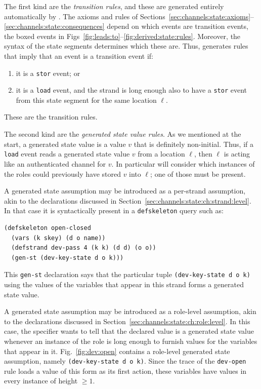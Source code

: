 The first kind are the \emph{transition rules}, and these are
generated entirely automatically by {\cpsa}.  The axioms and rules of
Sections~\ref{sec:channels:state:axioms}--\ref{sec:channels:state:consequences}
depend on which events are transition events, the boxed events in
Figs~\ref{fig:leads:to}--\ref{fig:derived:state:rules}.  Moreover, the
syntax of the state segments determines which these are.  Thus,
{\cpsa} generates rules that imply that an event is a transition event
if:
%
\begin{enumerate}
  \item it is a \verb|stor| event; or
  \item it is a \verb|load| event, and the strand is long enough also
  to have a \verb|stor| event from this state segment for the same
  location $\ell$.
\end{enumerate}
%
These are the transition rules.

The second kind are the \emph{generated state value rules}.  As we
mentioned at the start, a generated state value is a value $v$ that is
definitely non-initial.  Thus, if a \verb|load| event reads a
generated state value $v$ from a location $\ell$, then $\ell$ is
acting like an authenticated channel for $v$.  In particular {\cpsa}
will consider which instances of the roles could previously have
stored $v$ into $\ell$; one of those must be present.

A generated state assumption may be introduced as a per-strand
assumption, akin to the declarations discussed in
Section~\ref{sec:channels:state:ch:strand:level}.  In that case it is
syntactically present in a {\cpsa} \texttt{defskeleton} query such as:
%
{\small
\begin{verbatim}(defskeleton open-closed
  (vars (k skey) (d o name))
  (defstrand dev-pass 4 (k k) (d d) (o o))
  (gen-st (dev-key-state d o k)))
\end{verbatim}}
%
This \texttt{gen-st} declaration says that the particular tuple
\texttt{(dev-key-state d o k)} using the values of the variables that
appear in this strand forms a generated state value.


A generated state assumption may be introduced as a role-level
assumption, akin to the declarations discussed in
Section~\ref{sec:channels:state:ch:role:level}.  In this case, the
specifier wants to tell {\cpsa} that the declared value is a generated
state value whenever an instance of the role is long enough to furnish
values for the variables that appear in it.  Fig.~\ref{fig:dev:open}
contains a role-level generated state assumption, namely
\texttt{(dev-key-state d o k)}.  Since the trace of the
\texttt{dev-open} rule loads a value of this form as its first action,
these variables have values in every instance of height $\ge 1$.

